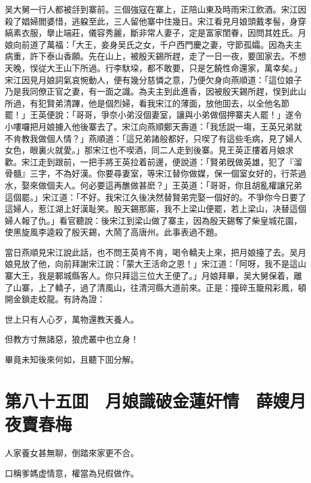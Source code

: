 吴大舅一行人都被㧱到寨前。三個強寇在寨上，正陪山東及時雨宋江飲酒。宋江因殺了娼婦閻婆惜，逃躱至此，三人留他寨中住幾日。宋江看見月娘頭戴孝髻，身穿縞素衣服，擧止端莊，儀容秀麗，斷非常人妻子，定是富家閨眷，因問其姓氏。月娘向前道了萬福：「大王，妾身吴氏之女，千户西門慶之妻，守節孤孀。因為夫主病重，許下泰山香願。先在山上，被殷天錫所趕，走了一日一夜，要囬家去。不想天晚，悮従大王山下所過。行李馱垜，都不敢要，只是乞饒性命還家，萬幸矣。」宋江因見月娘詞氣哀惋動人，便有幾分慈憐之意，乃便欠身向燕順道：「這位娘子乃是我同僚正官之妻，有一面之識。為夫主到此進香，因被殷天錫所趕，悮到此山所過，有犯賢弟清蹕，他是個烈婦，看我宋江的薄面，放他囬去，以全他名節罷！」王英便說：「哥哥，爭奈小弟沒個妻室，讓與小弟做個押寨夫人罷！」遂令小嘍囉把月娘擄入他後寨去了。宋江向燕順鄭天壽道：「我恁説一塲，王英兄弟就不肯教我做個人情？」燕順道：「這兄弟諸般都好，只喫了有這些毛病，見了婦人女色，眼裏火就愛。」那宋江也不喫酒，同二人走到後寨。見王英正摟着月娘求歡。宋江走到跟前，一把手將王英拉着前邊，便說道：「賢弟旣做英雄，犯了『溜骨髓』三字，不為好漢。你要尋妻室，等宋江替你做媒，保一個室女好的，行茶過水，娶來做個夫人。何必要這再醮做甚麽？」王英道：「哥哥，你且胡亂權讓兄弟這個罷。」宋江道：「不好。我宋江久後决然替賢弟完娶一個好的。不爭你今日要了這婦人，惹江湖上好漢耻笑。殷天錫那廝，我不上梁山便罷，若上梁山，决替這個婦人報了仇。」看官聽說：後宋江到梁山做了寨主，因為殷天錫奪了柴皇城花園，使黑旋風李逵殺了殷天錫，大鬧了高唐州。此事表過不題。

當日燕順見宋江說此話，也不問王英肯不肯，喝令轎夫上來，把月娘擡了去。吴月娘見放了他，向前拜謝宋江說：「蒙大王活命之恩！」宋江道：「阿呀，我不是這山寨大王，我是鄆城縣客人。你只拜這三位大王便了。」月娘拜畢，吴大舅保着，離了山寨，上了轎子，過了清風山，往清河縣大道前來。正是：撞碎玉籠飛彩鳳，頓開金鎖走蛟龍。有詩為證：

世上只有人心歹，萬物還教天養人。

但教方寸無諸惡，狼虎叢中也立身！

畢竟未知後來何如，且聽下囬分解。

\chapter*{第八十五囬　月娘識破金蓮奸情　薛嫂月夜賣春梅}

人家養女甚無聊，倒踏來家更不合。

口稱爹媽虚情意，權當為兒假做作。

